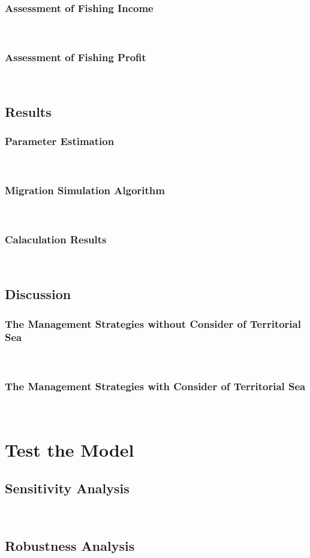 \documentclass{mcmthesis}
\begin{document}
\subsubsection{Assessment of Fishing Income}
\ 
\indent \lipsum[30]
\subsubsection{Assessment of Fishing Profit}
\ 
\indent \lipsum[31]
\subsection{Results}
\subsubsection{Parameter Estimation}
\ 
\indent \lipsum[32]
\subsubsection{Migration Simulation Algorithm}
\ 
\indent \lipsum[33]
\subsubsection{Calaculation Results}
\ 
\indent \lipsum[34]
\subsection{Discussion}
\subsubsection{The Management Strategies without Consider of Territorial Sea}
\ 
\indent \lipsum[35]
\subsubsection{The Management Strategies with Consider of Territorial Sea}
\ 
\indent \lipsum[36]

\section{Test the Model}
\subsection{Sensitivity Analysis}
\ 
\indent \lipsum[37]
\subsection{Robustness Analysis}
\ 
\indent \lipsum[38]
\end{document}
